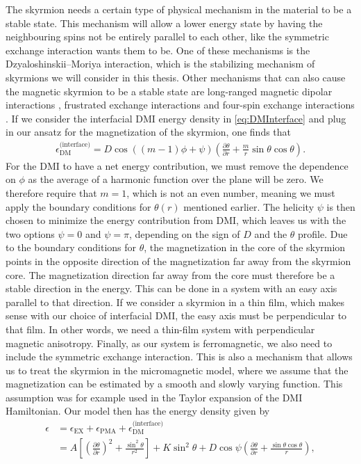 The skyrmion needs a certain type of physical mechanism in the material to be a stable state. This mechanism will allow a lower energy state by having the neighbouring spins not be entirely parallel to each other, like the symmetric exchange interaction wants them to be. One of these mechanisms is the Dzyaloshinskii--Moriya interaction, which is the stabilizing mechanism of skyrmions we will consider in this thesis. Other mechanisms that can also cause the magnetic skyrmion to be a stable state are long-ranged magnetic dipolar interactions \cite{Lin1973}, frustrated exchange interactions \cite{Okubo2012} and four-spin exchange interactions \cite{Heinze2011}. If we consider the interfacial DMI energy density in \eqref{eq:DMInterface} and plug in our ansatz for the magnetization of the skyrmion, one finds that
\begin{align}
\epsilon_{\text{DM}}^{\textrm{(interface)}} = D\cos((m-1)\phi + \psi)\left(\frac{\partial\theta}{\partial r} + \frac{m}{r}\sin\theta\cos\theta\right).
\end{align}
For the DMI to have a net energy contribution, we must remove the dependence on $\phi$ as the average of a harmonic function over the plane will be zero. We therefore require that $m = 1$, which is not an even number, meaning we must apply the boundary conditions for $\theta(r)$ mentioned earlier. The helicity $\psi$ is then chosen to minimize the energy contribution from DMI, which leaves us with the two options $\psi = 0$ and $\psi = \pi$, depending on the sign of $D$ and the $\theta$ profile. Due to the boundary conditions for $\theta$, the magnetization in the core of the skyrmion points in the opposite direction of the magnetization far away from the skyrmion core. The magnetization direction far away from the core must therefore be a stable direction in the energy. This can be done in a system with an easy axis parallel to that direction. If we consider a skyrmion in a thin film, which makes sense with our choice of interfacial DMI, the easy axis must be perpendicular to that film. In other words, we need a thin-film system with perpendicular magnetic anisotropy. Finally, as our system is ferromagnetic, we also need to include the symmetric exchange interaction. This is also a mechanism that allows us to treat the skyrmion in the micromagnetic model, where we assume that the magnetization can be estimated by a smooth and slowly varying function. This assumption was for example used in the Taylor expansion of the DMI Hamiltonian. Our model then has the energy density given by
\begin{align}
\nonumber \epsilon &= \epsilon_{\text{EX}} + \epsilon_{\text{PMA}} + \epsilon_{\text{DM}}^{\textrm{(interface)}} \\
&=A \left[\left(\frac{\partial\theta}{\partial r}\right)^2 + \frac{\sin^2\theta}{r^2}\right] + K\sin^2\theta + D\cos\psi\left(\frac{\partial\theta}{\partial r} + \frac{\sin\theta\cos\theta}{r}\right),
\end{align}
